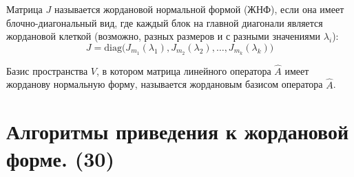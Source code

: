 \documentclass[14pt]{extreport}
\begin{document}
    \begin{defbox}
        Матрица $J$ называется жордановой нормальной формой (ЖНФ), если она имеет блочно-диагональный вид, где каждый блок на главной диагонали является жордановой клеткой (возможно, разных размеров и с разными значениями $\lambda_i$):$$J = \text{diag}\big(J_{m_1}(\lambda_1), J_{m_2}(\lambda_2), \dots, J_{m_k}(\lambda_k)\big)$$
    \end{defbox}

    \begin{defbox}
        Базис пространства $V$, в котором матрица линейного оператора $\hat{A}$ имеет жорданову нормальную форму, называется жордановым базисом оператора $\hat{A}$.
    \end{defbox}

    \chapter{Алгоритмы приведения к жордановой форме. (30)}
\end{document}
